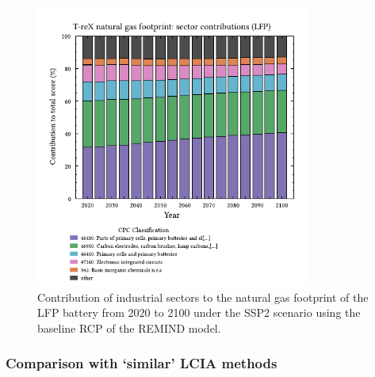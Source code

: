 \documentclass[a4paper,fleqn]{cas-dc}
\begin{document}
\begin{figure}[htbp]
	\centering
	\includegraphics[width=9cm]{figs/T-reX-wastefootprint-sectorcontributions.pdf}
	\caption{Contribution of industrial sectors to the natural gas footprint of the LFP battery from 2020 to 2100 under the SSP2 scenario using the baseline RCP of the REMIND model.}\label{fig:cpc_contribution}
\end{figure}


\subsubsection{Comparison with `similar' LCIA methods}\label{sec:results-case_study-methodcomparison}
\end{document}
